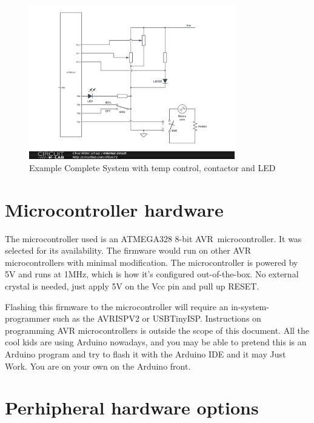 \documentclass[dvips,12pt]{article}
\begin{document}
\begin{figure}[h]
    \begin{centering}
    \includegraphics[width=0.8\textwidth]{max}
    \caption{Example Complete System with temp control, contactor and LED}
    \label{fig:max}
    \end{centering}
\end{figure}


\section{Microcontroller hardware}

The microcontroller used is an ATMEGA328 8-bit AVR\textcopyright\
microcontroller. It was selected for its availability. The firmware would
run on other AVR microcontrollers with minimal modification. The
microcontroller is powered by 5V and runs at 1MHz, which is how
it's configured out-of-the-box. No external crystal is needed, just apply
5V on the Vcc pin and pull up RESET. 

Flashing this firmware to the
microcontroller will require an in-system-programmer such as the AVRISPV2
or USBTinyISP. Instructions on programming AVR microcontrollers is outside
the scope of this document. All the cool kids are using Arduino nowadays,
and you may be able to pretend this is an Arduino program and try to flash
it with the Arduino IDE and it may Just Work. You are on your own on the Arduino
front.

\section{Perhipheral hardware options}
\end{document}
